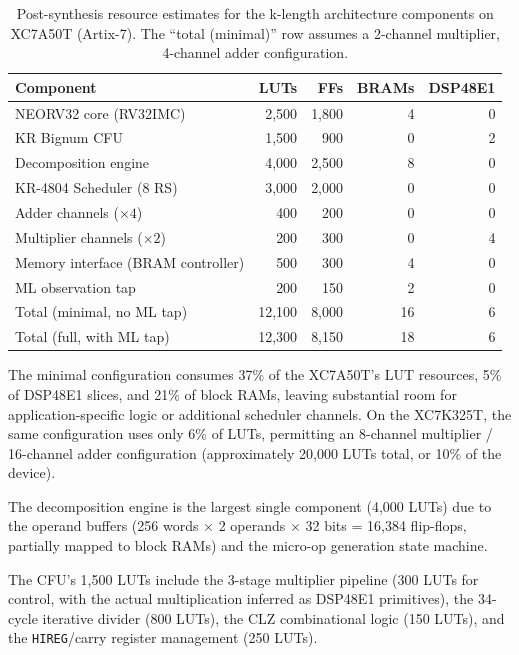 \documentclass[11pt,a4paper]{article}
\begin{document}
\begin{table}[t]
\centering
\caption{Post-synthesis resource estimates for the k-length architecture
  components on XC7A50T (Artix-7).  The ``total (minimal)'' row assumes a
  2-channel multiplier, 4-channel adder configuration.}
\label{tab:resource-estimates}
\begin{tabular}{@{}lrrrr@{}}
\toprule
Component & LUTs & FFs & BRAMs & DSP48E1 \\
\midrule
NEORV32 core (RV32IMC)      & 2,500 & 1,800 & 4 & 0 \\
KR Bignum CFU               & 1,500 & 900   & 0 & 2 \\
Decomposition engine        & 4,000 & 2,500 & 8 & 0 \\
KR-4804 Scheduler (8 RS)    & 3,000 & 2,000 & 0 & 0 \\
Adder channels ($\times 4$) & 400   & 200   & 0 & 0 \\
Multiplier channels ($\times 2$) & 200 & 300 & 0 & 4 \\
Memory interface (BRAM controller) & 500 & 300 & 4 & 0 \\
ML observation tap          & 200   & 150   & 2 & 0 \\
\midrule
Total (minimal, no ML tap)  & 12,100 & 8,000 & 16 & 6 \\
Total (full, with ML tap)   & 12,300 & 8,150 & 18 & 6 \\
\bottomrule
\end{tabular}
\end{table}

The minimal configuration consumes 37\% of the XC7A50T's LUT resources,
5\% of DSP48E1 slices, and 21\% of block RAMs, leaving substantial room
for application-specific logic or additional scheduler channels.  On the
XC7K325T, the same configuration uses only 6\% of LUTs, permitting an
8-channel multiplier / 16-channel adder configuration (approximately
20,000 LUTs total, or 10\% of the device).

The decomposition engine is the largest single component (4,000 LUTs)
due to the operand buffers (256 words $\times$ 2 operands $\times$ 32 bits
= 16,384 flip-flops, partially mapped to block RAMs) and the micro-op
generation state machine.

The CFU's 1,500 LUTs include the 3-stage multiplier pipeline (300 LUTs
for control, with the actual multiplication inferred as DSP48E1 primitives),
the 34-cycle iterative divider (800 LUTs), the CLZ combinational logic
(150 LUTs), and the \texttt{HIREG}/carry register management (250 LUTs).
\end{document}
